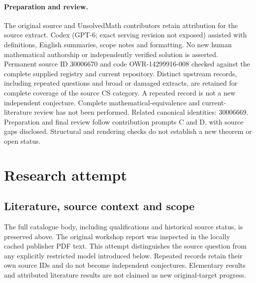 \documentclass[11pt]{article}
\begin{document}
\paragraph{Preparation and review.}
The original source and UnsolvedMath contributors retain attribution for the source extract. Codex (GPT-6; exact serving revision not exposed) assisted with definitions, English summaries, scope notes and formatting. No new human mathematical authorship or independently verified solution is asserted. Permanent source ID 30006670 and code OWR-14299916-008 checked against the complete supplied registry and current repository. Distinct upstream records, including repeated questions and broad or damaged extracts, are retained for complete coverage of the source CS category. A repeated record is not a new independent conjecture. Complete mathematical-equivalence and current-literature review has not been performed. Related canonical identities: 30006669. Preparation and final review follow contribution prompts C and D, with source gaps disclosed. Structural and rendering checks do not establish a new theorem or open status.
\label{end:30006670}

\section{Research attempt}
\subsection{Literature, source context and scope}
The full catalogue body, including qualifications and historical source status, is preserved above. The original workshop report was inspected in the locally cached publisher PDF text. This attempt distinguishes the source question from any explicitly restricted model introduced below. Repeated records retain their own source IDs and do not become independent conjectures. Elementary results and attributed literature results are not claimed as new original-target progress.
\end{document}
